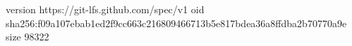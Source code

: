 version https://git-lfs.github.com/spec/v1
oid sha256:f09a107ebab1ed2f9cc663c216809466713b5e817bdea36a8ffdba2b70770a9e
size 98322
